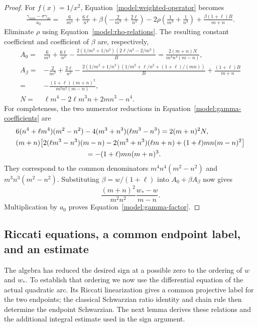 \begin{proof}
For \(f(x)=1/x^2\), Equation~\eqref{model:weighted-operator} becomes
\begin{align}
 \frac{\gamma_{mm}-\sigma\gamma_m}{a_0}
 ={}&\frac6{m^4}+\frac{6\ell}{n^4}
       +\beta\left(-\frac2{m^3}+\frac{2\ell}{n^3}\right)
       -2\rho\left(\frac1{m^3}+\frac1{n^3}\right)
       +\frac{\beta(1+\ell)B}{m+n}.
 \label{model:gamma-intermediate}
\end{align}
Eliminate \(\rho\) using Equation~\eqref{model:rho-relations}.
The resulting constant coefficient and coefficient of \(\beta\) are,
respectively,
\begin{align}
 A_0={}&\frac6{m^4}+\frac{6\ell}{n^4}
   -\frac{2(1/m^3+1/n^3)(2\ell/n^3-2/m^3)}{B}
 =\frac{2(m+n)N}{m^4n^4(m-n)},\nonumber\\
 A_\beta={}&-\frac2{m^3}+\frac{2\ell}{n^3}
 -\frac{2(1/m^3+1/n^3)
       (1/m^2+\ell/n^2+(1+\ell)/(mn))}{B}
 +\frac{(1+\ell)B}{m+n}\nonumber\\
 ={}&-\frac{(1+\ell)(m+n)^2}{m^2n^2(m-n)},
 \label{model:gamma-coefficients}\\
 N={}&\ell m^4-2\ell m^3n+2mn^3-n^4.\nonumber
\end{align}
For completeness, the two numerator reductions in
Equation~\eqref{model:gamma-coefficients} are
\begin{align*}
 &6(n^4+\ell m^4)(m^2-n^2)
       -4(m^3+n^3)(\ell m^3-n^3)=2(m+n)^2N,\\
 &(m+n)\bigl[2(\ell m^3-n^3)(m-n)
       -2(m^3+n^3)(\ell m+n)
       +(1+\ell)mn(m-n)^2\bigr]\\
 &\hspace{35mm}=-(1+\ell)mn(m+n)^3.
\end{align*}
They correspond to the common denominators
\(m^4n^4(m^2-n^2)\) and \(m^3n^3(m^2-n^2)\).
Substituting \(\beta=w/(1+\ell)\) into \(A_0+\beta A_\beta\)
now gives
\[
 \frac{(m+n)^2}{m^2n^2}\frac{w_*-w}{m-n}.
\]
Multiplication by \(a_0\) proves
Equation~\eqref{model:gamma-factor}.
\end{proof}

\subsection{Riccati equations, a common endpoint label, and an estimate}

The algebra has reduced the desired sign at a possible zero to the
ordering of $w$ and $w_*$. To establish that ordering we now use
the differential equation of the actual quadratic arc. Its Riccati
linearization gives a common projective label for the two endpoints;
the classical Schwarzian ratio identity and chain rule
\cite{OT} then determine the endpoint Schwarzian.
The next lemma derives these relations and the additional integral
estimate used in the sign argument.

